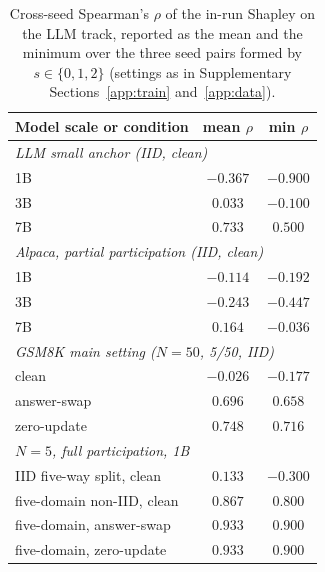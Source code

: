 \documentclass[letterpaper]{article} %
\theoremstyle{plain}
\begin{document}
\begin{table}[!t]
\centering
\small
\setlength{\tabcolsep}{4pt}
\begin{tabular}{lcc}
\hline
Model scale or condition & mean $\rho$ & min $\rho$ \\
\hline
\multicolumn{3}{l}{\emph{LLM small anchor (IID, clean)}} \\
1B & $-0.367$ & $-0.900$ \\
3B & $0.033$ & $-0.100$ \\
7B & $0.733$ & $0.500$ \\
\hline
\multicolumn{3}{l}{\emph{Alpaca, partial participation (IID, clean)}} \\
1B & $-0.114$ & $-0.192$ \\
3B & $-0.243$ & $-0.447$ \\
7B & $0.164$ & $-0.036$ \\
\hline
\multicolumn{3}{l}{\emph{GSM8K main setting ($N{=}50$, 5/50, IID)}} \\
clean & $-0.026$ & $-0.177$ \\
answer-swap & $0.696$ & $0.658$ \\
zero-update & $0.748$ & $0.716$ \\
\hline
\multicolumn{3}{l}{\emph{$N{=}5$, full participation, 1B}} \\
IID five-way split, clean & $0.133$ & $-0.300$ \\
five-domain non-IID, clean & $0.867$ & $0.800$ \\
five-domain, answer-swap & $0.933$ & $0.900$ \\
five-domain, zero-update & $0.933$ & $0.900$ \\
\hline
\end{tabular}
\caption{Cross-seed Spearman's $\rho$ of the in-run Shapley on the LLM track,
reported as the mean and the minimum over the three seed pairs formed by
$s \in \{0, 1, 2\}$ (settings as in Supplementary Sections~\ref{app:train}
and~\ref{app:data}).}
\label{tab:target-stability}
\end{table}
\end{document}
